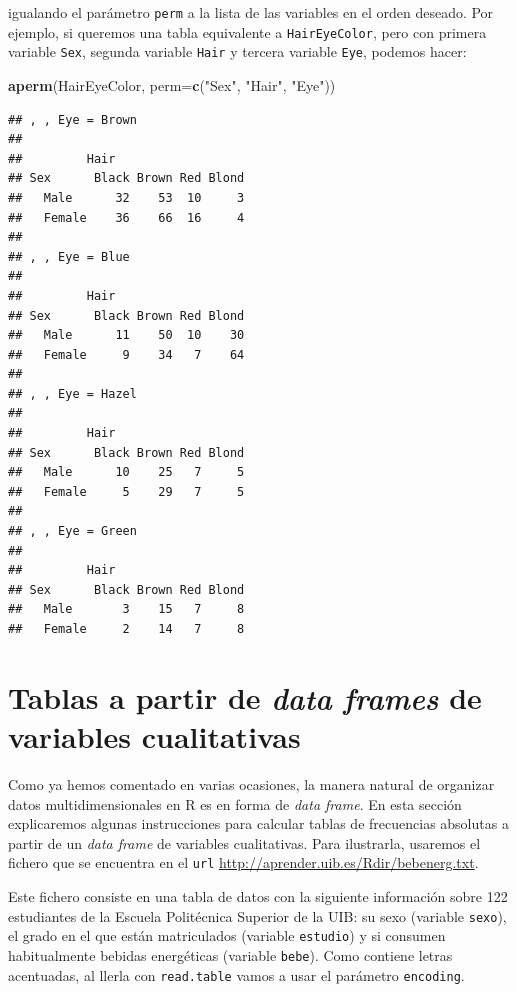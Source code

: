 \documentclass[]{book}
\newenvironment{Shaded}{\begin{snugshade}}{\end{snugshade}}
\newcommand{\DataTypeTok}[1]{\textcolor[rgb]{0.13,0.29,0.53}{#1}}
\newcommand{\KeywordTok}[1]{\textcolor[rgb]{0.13,0.29,0.53}{\textbf{#1}}}
\newcommand{\NormalTok}[1]{#1}
\newcommand{\StringTok}[1]{\textcolor[rgb]{0.31,0.60,0.02}{#1}}
\theoremstyle{definition}
\theoremstyle{definition}
\theoremstyle{definition}
\theoremstyle{remark}
\begin{document}
igualando el parámetro \texttt{perm} a la lista de las variables en el orden deseado. Por ejemplo, si queremos una tabla equivalente a \texttt{HairEyeColor}, pero con primera variable \texttt{Sex}, segunda variable \texttt{Hair} y tercera variable \texttt{Eye}, podemos hacer:

\begin{Shaded}
\begin{Highlighting}[]
\KeywordTok{aperm}\NormalTok{(HairEyeColor, }\DataTypeTok{perm=}\KeywordTok{c}\NormalTok{(}\StringTok{"Sex"}\NormalTok{, }\StringTok{"Hair"}\NormalTok{, }\StringTok{"Eye"}\NormalTok{))}
\end{Highlighting}
\end{Shaded}

\begin{verbatim}
## , , Eye = Brown
## 
##         Hair
## Sex      Black Brown Red Blond
##   Male      32    53  10     3
##   Female    36    66  16     4
## 
## , , Eye = Blue
## 
##         Hair
## Sex      Black Brown Red Blond
##   Male      11    50  10    30
##   Female     9    34   7    64
## 
## , , Eye = Hazel
## 
##         Hair
## Sex      Black Brown Red Blond
##   Male      10    25   7     5
##   Female     5    29   7     5
## 
## , , Eye = Green
## 
##         Hair
## Sex      Black Brown Red Blond
##   Male       3    15   7     8
##   Female     2    14   7     8
\end{verbatim}

\hypertarget{tablas-a-partir-de-data-frames-de-variables-cualitativas}{%
\section{\texorpdfstring{Tablas a partir de \emph{data frames} de variables cualitativas}{Tablas a partir de data frames de variables cualitativas}}\label{tablas-a-partir-de-data-frames-de-variables-cualitativas}}

Como ya hemos comentado en varias ocasiones, la manera natural de organizar datos multidimensionales en R es en forma de \emph{data frame}. En esta sección explicaremos algunas instrucciones para calcular tablas de frecuencias absolutas a partir de un \emph{data frame} de variables cualitativas. Para ilustrarla, usaremos el fichero que se encuentra en el \texttt{url} \url{http://aprender.uib.es/Rdir/bebenerg.txt}.

Este fichero consiste en una tabla de datos con la siguiente información sobre 122 estudiantes de la Escuela Politécnica Superior de la UIB: su sexo (variable \texttt{sexo}), el grado en el que están matriculados
(variable \texttt{estudio}) y si consumen habitualmente bebidas energéticas (variable \texttt{bebe}). Como contiene letras acentuadas, al llerla con \texttt{read.table} vamos a usar el parámetro \texttt{encoding}.
\end{document}

